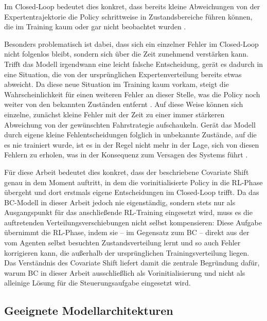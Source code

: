 Im Closed-Loop bedeutet dies konkret, dass bereits kleine Abweichungen von der Expertentrajektorie die Policy schrittweise in Zustandsbereiche führen können, die im Training kaum oder gar nicht beobachtet wurden \cite[vgl.~S.~3]{chap2_Kar25}.

Besonders problematisch ist dabei, dass sich ein einzelner Fehler im Closed-Loop nicht folgenlos bleibt, sondern sich über die Zeit zunehmend verstärken kann. 
Trifft das Modell irgendwann eine leicht falsche Entscheidung, gerät es dadurch in eine Situation, die von der ursprünglichen Expertenverteilung bereits etwas abweicht. 
Da diese neue Situation im Training kaum vorkam, steigt die Wahrscheinlichkeit für einen weiteren Fehler an dieser Stelle, was die Policy noch weiter von den bekannten Zuständen entfernt \cite[vgl.~S.~1]{chap2_Ros10}. 
Auf diese Weise können sich einzelne, zunächst kleine Fehler mit der Zeit zu einer immer stärkeren Abweichung von der gewünschten Fahrstrategie aufschaukeln. 
Gerät das Modell durch eigene kleine Fehlentscheidungen folglich in unbekannte Zustände, auf die es nie trainiert wurde, ist es in der Regel nicht mehr in der Lage, sich von diesen Fehlern zu erholen, was in der Konsequenz zum Versagen des Systems führt \cite[vgl.~S.~16ff.]{chap2_Are20}.

Für diese Arbeit bedeutet dies konkret, dass der beschriebene Covariate Shift genau in dem Moment auftritt, in dem die vorinitialisierte Policy in die \gls{RL}-Phase übergeht und dort erstmals eigene Entscheidungen im Closed-Loop trifft. 
Da das \gls{BC}-Modell in dieser Arbeit jedoch nie eigenständig, sondern stets nur als Ausgangspunkt für das anschließende \gls{RL}-Training eingesetzt wird, muss es die auftretenden Verteilungsverschiebungen nicht selbst kompensieren: Diese Aufgabe übernimmt die \gls{RL}-Phase, indem sie -- im Gegensatz zum \gls{BC} -- direkt aus der vom Agenten selbst besuchten Zustandsverteilung lernt und so auch Fehler korrigieren kann, die außerhalb der ursprünglichen Trainingsverteilung liegen. 
Das Verständnis des Covariate Shift liefert damit die zentrale Begründung dafür, warum \gls{BC} in dieser Arbeit ausschließlich als Vorinitialisierung und nicht als alleinige Lösung für die Steuerungsaufgabe eingesetzt wird.

\subsection{Geeignete Modellarchitekturen}
\label{sec:modellarchitekturen}

